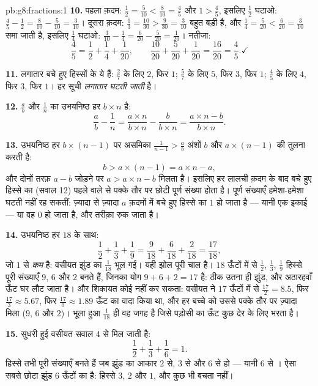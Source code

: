 \begin{solution}{pb:g8:fractions:1}
\textbf{10.} पहला क़दम: $\frac12 = \frac{5}{10} < \frac{8}{10} =
\frac45$ और $1 > \frac45$, इसलिए $\frac12$ घटाओ:
$\frac45 - \frac12 = \frac{8}{10} - \frac{5}{10} = \frac{3}{10}$।
दूसरा क़दम: $\frac13 = \frac{10}{30} > \frac{9}{30} =
\frac{3}{10}$ बहुत बड़ी है, और $\frac14 = \frac{5}{20} <
\frac{6}{20} = \frac{3}{10}$ समा जाती है, इसलिए $\frac14$ घटाओ:
$\frac{3}{10} - \frac14 = \frac{6}{20} - \frac{5}{20} =
\frac{1}{20}$। नतीजा:
\[
\frac45 = \frac12 + \frac14 + \frac{1}{20},
\qquad
\frac{10}{20} + \frac{5}{20} + \frac{1}{20} = \frac{16}{20}
= \frac45 . \checkmark
\]

\textbf{11.} लगातार बचे हुए हिस्सों के  ये हैं: $\frac27$ के
लिए $2$, फिर $1$; $\frac57$ के लिए $5$, फिर $3$, फिर $1$;
$\frac45$ के लिए $4$, फिर $3$, फिर $1$। हर सूची \emph{लगातार घटती
जाती} है।

\textbf{12.} $\frac ab$ और $\frac1n$ का उभयनिष्ठ हर $b \times n$
है:
\[
\frac{a}{b} - \frac{1}{n}
= \frac{a \times n}{b \times n} - \frac{b}{b \times n}
= \frac{a \times n - b}{b \times n} .
\]

\textbf{13.} उभयनिष्ठ हर $b \times (n-1)$ पर असमिका
$\frac{1}{n-1} > \frac ab$ अंशों $b$ और $a \times (n - 1)$ की
तुलना करती है:
\[
b > a \times (n - 1) = a \times n - a ,
\]
और दोनों तरफ़ $a - b$ जोड़ने पर $a > a \times n - b$ मिलता है।
इसलिए हर लालची क़दम के बाद बचे हुए हिस्से का  (सवाल 12) पहले
वाले से पक्के तौर पर छोटी पूर्ण संख्या होता है। पूर्ण संख्याएँ
हमेशा-हमेशा घटती नहीं रह सकतीं: ज़्यादा से ज़्यादा $a$ क़दमों में
बचे हुए हिस्से का  $1$ हो जाता है --- यानी एक इकाई  --- या
वह $0$ हो जाता है, और तरीक़ा रुक जाता है।

\textbf{14.} उभयनिष्ठ हर $18$ के साथ:
\[
\frac12 + \frac13 + \frac19
= \frac{9}{18} + \frac{6}{18} + \frac{2}{18}
= \frac{17}{18} ,
\]
जो $1$ से \emph{कम} है: वसीयत झुंड का $\frac{1}{18}$ भूल गई। यही
झोल पूरी चाल है। $18$ ऊँटों में से $\frac12$, $\frac13$, $\frac19$
हिस्से पूरी संख्याएँ $9$, $6$ और $2$ बनते हैं, जिनका योग
$9 + 6 + 2 = 17$ है: ठीक उतना ही झुंड, और अठारहवाँ ऊँट घर लौट जाता
है। और शिकायत कोई नहीं कर सकता: वसीयत ने $17$ ऊँटों में से
$\frac{17}{2} = 8.5$, फिर $\frac{17}{3} \approx 5.67$, फिर
$\frac{17}{9} \approx 1.89$ ऊँट का वादा किया था, और हर बच्चे को
उससे पक्के तौर पर ज़्यादा मिला ($9$, $6$ और $2$)। भूला हुआ
$\frac{1}{18}$ ही वह जगह है जिसे पड़ोसी का ऊँट कुछ देर के लिए भरता
है।

\textbf{15.} सुधरी हुई वसीयत सवाल 4 से मिल जाती है:
\[
\frac12 + \frac13 + \frac16 = 1 .
\]
हिस्से तभी पूरी संख्याएँ बनते हैं जब झुंड का आकार $2$ से, $3$ से
और $6$ से  हो --- यानी $6$ से । ऐसा सबसे छोटा झुंड
$6$ ऊँटों का है: हिस्से $3$, $2$ और $1$, और कुछ भी बचता नहीं।

\end{solution}
